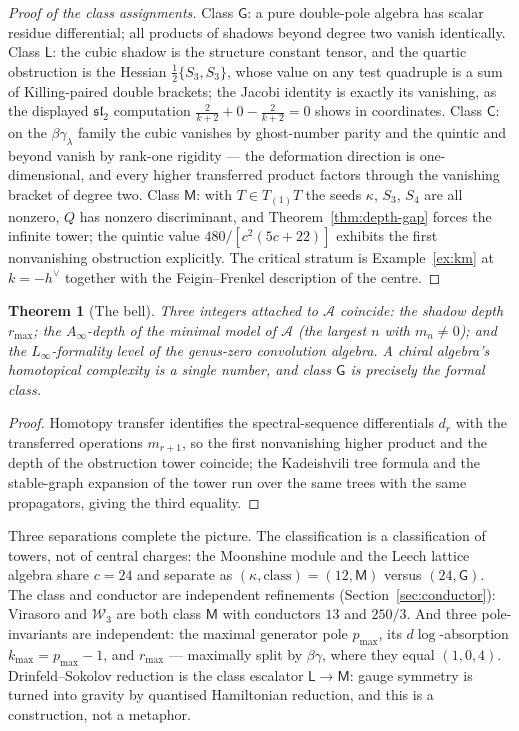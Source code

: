 \documentclass[11pt]{amsart}
\numberwithin{equation}{section}
\theoremstyle{plain}
\newtheorem{theorem}{Theorem}[section]
\theoremstyle{definition}
\theoremstyle{remark}
\newcommand{\cA}{\mathcal{A}}
\newcommand{\cW}{\mathcal{W}}
\newcommand{\dvee}{h^{\vee}}
\begin{document}
\begin{proof}[Proof of the class assignments]
Class $\mathsf{G}$: a pure double-pole algebra has scalar residue
differential; all products of shadows beyond degree two vanish
identically. Class $\mathsf{L}$: the cubic shadow is the structure
constant tensor, and the quartic obstruction is the Hessian
$\tfrac12\{S_3,S_3\}$, whose value on any test quadruple is a sum of
Killing-paired double brackets; the Jacobi identity is exactly its
vanishing, as the displayed $\mathfrak{sl}_2$ computation
$\tfrac{2}{k+2}+0-\tfrac{2}{k+2}=0$ shows in coordinates. Class
$\mathsf{C}$: on the $\beta\gamma_\lambda$ family the cubic vanishes
by ghost-number parity and the quintic and beyond vanish by rank-one
rigidity --- the deformation direction is one-dimensional, and every
higher transferred product factors through the vanishing bracket of
degree two. Class $\mathsf{M}$: with $T\in T_{(1)}T$ the seeds
$\kappa$, $S_3$, $S_4$ are all nonzero, $Q$ has nonzero discriminant,
and Theorem~\ref{thm:depth-gap} forces the infinite tower; the
quintic value $480/[c^{2}(5c+22)]$ exhibits the first nonvanishing
obstruction explicitly. The critical stratum is
Example~\ref{ex:km} at $k=-\dvee$ together with the Feigin--Frenkel
description of the centre.
\end{proof}

\begin{theorem}[The bell]\label{thm:bell}
Three integers attached to $\cA$ coincide: the shadow depth $r_{\max}$;
the $A_\infty$-depth of the minimal model of $\cA$ (the largest $n$ with
$m_n\neq0$); and the $L_\infty$-formality level of the genus-zero
convolution algebra. A chiral algebra's homotopical complexity is a
single number, and class $\mathsf{G}$ is precisely the formal class.
\end{theorem}

\begin{proof}
Homotopy transfer identifies the spectral-sequence differentials
$d_r$ with the transferred operations $m_{r+1}$, so the first
nonvanishing higher product and the depth of the obstruction tower
coincide; the Kadeishvili tree formula and the stable-graph expansion
of the tower run over the same trees with the same propagators, giving
the third equality.
\end{proof}

Three separations complete the picture. The classification is a
classification of towers, not of central charges: the Moonshine module and
the Leech lattice algebra share $c=24$ and separate as
$(\kappa,\text{class})=(12,\mathsf{M})$ versus $(24,\mathsf{G})$. The
class and conductor are independent refinements
(Section~\ref{sec:conductor}):
Virasoro and $\cW_3$ are both class $\mathsf{M}$ with conductors $13$ and
$250/3$. And three pole-invariants are independent: the maximal generator
pole $p_{\max}$, its $d\log$-absorption $k_{\max}=p_{\max}-1$, and
$r_{\max}$ --- maximally split by $\beta\gamma$, where they equal
$(1,0,4)$. Drinfeld--Sokolov reduction is the class escalator
$\mathsf{L}\to\mathsf{M}$: gauge symmetry is turned into gravity by
quantised Hamiltonian reduction, and this is a construction, not a
metaphor.
\end{document}
